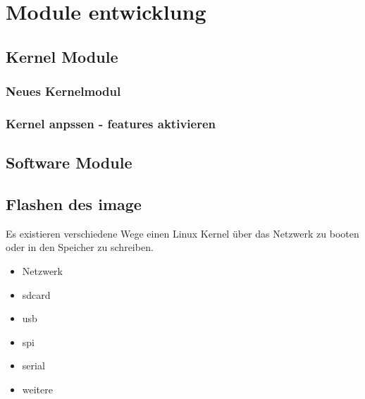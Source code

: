 
\chapter{Module entwicklung}%
\label{cha:module_entwicklung}


\section{Kernel Module}%
\label{sec:kernel_module}

\subsection{Neues Kernelmodul}%
\label{sub:neues_kernelmodul}


\subsection{Kernel anpssen - features aktivieren}%
\label{sub:kernel_anpssen_features_aktivieren}


\section{Software Module}%
\label{sec:software_module}


\section{Flashen  des image}%
\label{sec:flashen_des_image}

Es existieren verschiedene Wege einen Linux Kernel über das Netzwerk zu booten
oder in den Speicher zu schreiben.

\begin{itemize}
    \item Netzwerk
    \item sdcard
    \item usb
    \item spi
    \item serial
    \item weitere
\end{itemize}
















%
%
%
%
%
%
%
%
%
%
